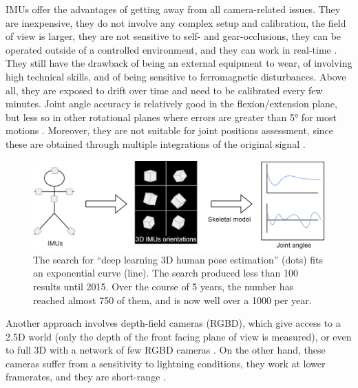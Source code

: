 IMUs offer the advantages of getting away from all camera-related issues. They are inexpensive, they do not involve any complex setup and calibration, the field of view is larger, they are not sensitive to self- and gear-occlusions, they can be operated outside of a controlled environment, and they can work in real-time \cite{Johnston2019,Chambers2015}. They still have the drawback of being an external equipment to wear, of involving high technical skills, and of being sensitive to ferromagnetic disturbances. Above all, they are exposed to drift over time and need to be calibrated every few minutes. Joint angle accuracy is relatively good in the flexion/extension plane, but less so in other rotational planes where errors are greater than 5° for most motions \cite{Zhang2013, Rekant2022}. Moreover, they are not suitable for joint positions assessment, since these are obtained through multiple integrations of the original signal \cite{Ahmad2013}. 

\begin{figure}[hbtp]
	\centering
	\def\svgwidth{1\columnwidth}
	\fontsize{10pt}{10pt}\selectfont
	\includegraphics[width=\linewidth]{"../Chap1/Figures/IMUs.png"}
	\caption{The search for “deep learning 3D human pose estimation” (dots) fits an exponential curve (line). The search produced less than 100 results until 2015. Over the course of 5 years, the number has reached almost 750 of them, and is now well over a 1000 per year.}
	\label{fig_imus}
\end{figure}
\FloatBarrier




Another approach involves depth-field cameras (RGBD), which give access to a 2.5D world (only the depth of the front facing plane of view is measured), or even to full 3D with a network of few RGBD cameras \cite{Carraro2017,Choppin2013,Colombel2020}. On the other hand, these cameras suffer from a sensitivity to lightning conditions, they work at lower framerates, and they are short-range \cite{Han2013}. 


